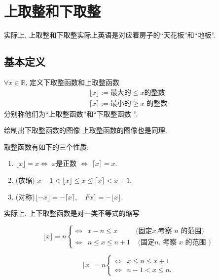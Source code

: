 \documentclass{ctexart}
\begin{document}
\section{上取整和下取整} 

实际上, 上取整和下取整实际上英语是对应着房子的``天花板''和``地板''. 


\subsection{基本定义} 

\begin{definition}[上取整和下取整]
    $\forall x \in \mathbb{R}$, 定义下取整函数和上取整函数
    \begin{align*}
    \lfloor x\rfloor:= \text{最大的} \leqslant x \text{的整数}\\
    \lceil x\rceil := \text{最小的} \geqslant x\text{ 的整数}
    \end{align*}
    分别称他们为``上取整函数''和``下取整函数 ''.
    
\end{definition}

\begin{example}绘制出下取整函数的图像
   上取整函数的图像也是同理.  
\end{example}

\begin{prop}
    取整函数有如下的三个性质: 

    \begin{enumerate}
        \item $\lfloor x\rfloor=x \iff$ $x$是正数 $\iff $ $\lceil x\rceil=x$.
        \item (放缩) $x-1<\lfloor x\rfloor \leqslant x \leqslant\lceil x\rceil<x+1$.
        \item (对称)$\lfloor-x\rfloor=-\lceil x\rceil, \quad F x\rceil=-\lfloor x\rfloor$.
    \end{enumerate}
    
\end{prop}

\begin{prop}
    实际上, 上下取整函数是对一类不等式的缩写

    $$
\lfloor x\rfloor=n\left\{\begin{array}{lll}
    \iff & x-n \leqslant x & \text {(固定}x\text{,考察 } n \text { 的范围) } \\
\iff & n \leqslant x \leqslant n+1 & \text { (固定}n\text{, 考察 } x \text { 的范围 })
\end{array}\right.
$$

$$
\lceil x\rceil=n \begin{cases}\iff & x \leqslant n \leqslant x+1 \\ \iff & n-1<x \leqslant n .\end{cases}
$$

    
\end{prop}
\end{document}
